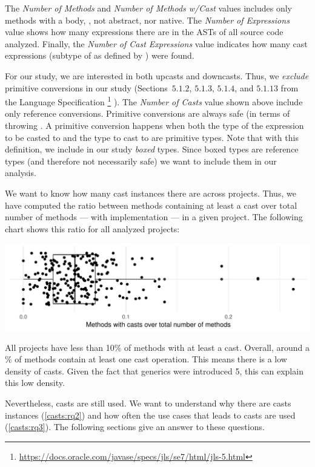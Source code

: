 The \emph{Number of Methods} and \emph{Number of Methods w/Cast} values includes only methods with a body, \ie{}, not abstract, nor native.
The \emph{Number of Expressions} value shows how many expressions there are in the ASTs of all source code analyzed.
Finally, the \emph{Number of Cast Expressions} value indicates how many cast expressions (subtype of  as defined by \ql{}) were found.

For our study, we are interested in both upcasts and downcasts.
Thus, we \emph{exclude} primitive conversions in our study
(Sections~$5.1.2$, $5.1.3$, $5.1.4$, and $5.1.13$ from the \java{} Language Specification%
\footnote{\url{https://docs.oracle.com/javase/specs/jls/se7/html/jls-5.html}}
).
The \emph{Number of Casts} value shown above include only reference conversions.
Primitive conversions are always safe (in terms of throwing .
A primitive conversion happens when both the type of the expression to be casted to and
the type to cast to are primitive types.
Note that with this definition, we include in our study \emph{boxed} types.
Since boxed types are reference types (and therefore not necessarily safe)
we want to include them in our analysis.

We want to know how many cast instances there are across projects.
Thus, we have computed the ratio between methods containing
at least a cast over total number of methods --- with implementation --- in a given project.
The following chart shows this ratio for all analyzed projects:

\includegraphics[width=0.9\columnwidth]{chapters/casts/stats-methodwcastXproject.pdf}

All projects have less than 10\% of methods with at least a cast.
Overall, around a \castpercentage{}\% of methods contain at least one cast operation. 
This means there is a low density of casts.
Given the fact that generics were introduced \java{} 5, this can explain this low density.

Nevertheless, casts are still used.
We want to understand why there are casts instances (\ref{casts:rq2}) and how often the use cases that leads to casts are used (\ref{casts:rq3}).
The following sections give an answer to these questions.

